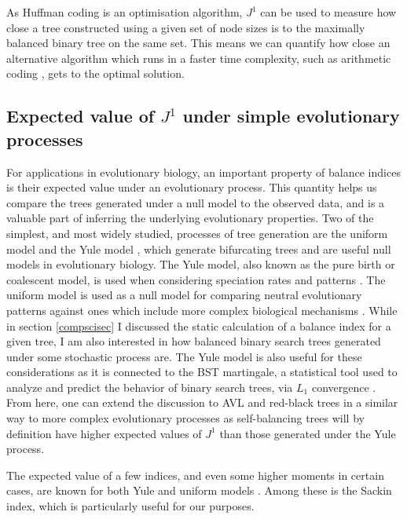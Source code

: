 As Huffman coding is an optimisation algorithm, $J^1$ can be used to measure how
close a tree constructed using a given set of node sizes is to the maximally
balanced binary tree on the same set. This means we can quantify how close an
alternative algorithm which runs in a faster time complexity, such as arithmetic
coding \citep{pasco_source_1977}, gets to the optimal solution.

\subsection{Expected value of $J^1$ under simple evolutionary processes}\label{expsection}

For applications in evolutionary biology, an important property of balance
indices is their expected value under an evolutionary process. This quantity
helps us compare the trees generated under a null model to the observed data,
and is a valuable part of inferring the underlying evolutionary properties.
Two of the simplest, and most widely studied, processes of tree generation are
the uniform model \citep{rosen_vicariant_1978} and the Yule model
\citep{yule_iimathematical_1925}, which generate bifurcating trees and are
useful null models in evolutionary biology. The Yule model, also known as the
pure birth or coalescent model, is used when considering speciation rates and
patterns \citep{aldous_stochastic_2001, steel_properties_2001}. The uniform
model is used as a null model for comparing neutral evolutionary patterns
against ones which include more complex biological mechanisms
\citep{mooers_inferring_1997, mckenzie_distributions_2000}. While in section
\ref{compscisec} I discussed the static calculation of a balance index for a
given tree, I am also interested in how balanced binary search trees generated
under some stochastic process are. The Yule model is also useful for these
considerations as it is connected to the BST martingale, a statistical tool
used to analyze and predict the behavior of binary search trees, via $L_1$
convergence \citep{chauvin_connecting_2004}. From here, one can extend the
discussion to AVL and red-black trees in a similar way to more complex
evolutionary processes as self-balancing trees will by definition have higher
expected values of $J^1$ than those generated under the Yule process. \par
The expected value of a few indices, and even some higher moments in certain
cases, are known for both Yule and uniform models
\citep{mir_new_2013, m_coronado_sackins_2020, goh_two_2022}. Among these is the
Sackin index, which is particularly useful for our purposes. \par

